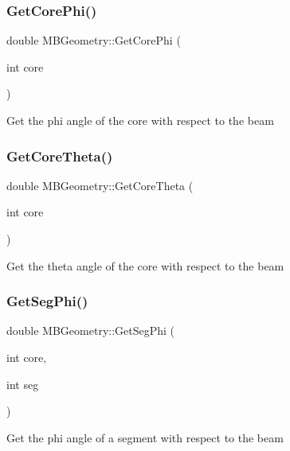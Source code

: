 \subsubsection{\texorpdfstring{Get\+Core\+Phi()}{GetCorePhi()}}
{\footnotesize\ttfamily double M\+B\+Geometry\+::\+Get\+Core\+Phi (\begin{DoxyParamCaption}\item[{int}]{core }\end{DoxyParamCaption})}

Get the phi angle of the core with respect to the beam \mbox{\label{class_m_b_geometry_a42aa536f15017724812712b0f8a77c12}} 
\subsubsection{\texorpdfstring{Get\+Core\+Theta()}{GetCoreTheta()}}
{\footnotesize\ttfamily double M\+B\+Geometry\+::\+Get\+Core\+Theta (\begin{DoxyParamCaption}\item[{int}]{core }\end{DoxyParamCaption})}

Get the theta angle of the core with respect to the beam \mbox{\label{class_m_b_geometry_a575ddd6022d2d686a83ebce3195b6c50}} 
\subsubsection{\texorpdfstring{Get\+Seg\+Phi()}{GetSegPhi()}}
{\footnotesize\ttfamily double M\+B\+Geometry\+::\+Get\+Seg\+Phi (\begin{DoxyParamCaption}\item[{int}]{core,  }\item[{int}]{seg }\end{DoxyParamCaption})}

Get the phi angle of a segment with respect to the beam \mbox{\label{class_m_b_geometry_a49cdf742a2902fc85f0b24dfffa554a8}} 
